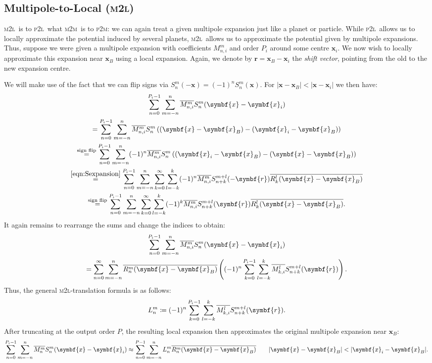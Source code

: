 \documentclass{scrbook}
\newcommand{\PtoM}{\textsc{p2m}}
\newcommand{\PtoL}{\textsc{p2l}}
\newcommand{\MtoM}{\textsc{m2m}}
\newcommand{\MtoL}{\textsc{m2l}}
\newcommand{\vv}[1]{\ensuremath{\symbf{#1}}} %
\begin{document}
\subsection{Multipole-to-Local (\MtoL)}
\MtoL\ is to \PtoL\ what \MtoM\ is to \PtoM: we can again treat a given
multipole expansion just like a planet or particle. While \PtoL\ allows
us to locally approximate the potential induced by several planets, \MtoL\
allows us to approximate the potential given by multipole expansions. Thus,
suppose we were given a multipole expansion with coefficients $M_{n,i}^m$ and
order $P_i$ around some centre $\vv{x}_i$. We now wish to locally approximate
this expansion near $\vv{x}_B$ using a local expansion. Again, we denote
by $\vv{r}=\vv{x}_B-\vv{x}_i$ the \emph{shift vector}, pointing from the old to
the new expansion centre.

We will make use of the fact that we can flip signs via $S_n^m(-\vv{x}) =
(-1)^nS_n^m(\vv{x})$. For $|\vv{x}-\vv{x}_B| < |\vv{x}-\vv{x}_i|$ we then have:
\begin{multline}
\sum_{n=0}^{P_i-1}\sum_{m=-n\vphantom{0}}^n%
\overline{M_{n,i}^m}S_n^m(\vv{x}-\vv{x}_i) \\
= 
\sum_{n=0}^{P_i-1}\sum_{m=-n\vphantom{0}}^n%
\overline{M_{n,i}^m}S_n^m\left((\vv{x}-\vv{x}_B)-(\vv{x}_i-\vv{x}_B)\right) \\
\stackrel{\text{sign flip}}{=}
\sum_{n=0}^{P_i-1}\sum_{m=-n\vphantom{0}}^n(-1)^n
\overline{M_{n,i}^m}S_n^m\left((\vv{x}_i-\vv{x}_B)-(\vv{x}-\vv{x}_B)\right) \\
\stackrel{\eqref{eqn:Sexpansion}}{=}
\sum_{n=0}^{P_i-1}\sum_{m=-n\vphantom{0}}^{n}
\sum_{k=0}^{\infty}\sum_{l=-k\vphantom{0}}^{k}(-1)^n
\overline{M_{n,i}^m}S_{n+k}^{m+l}(-\vv{r})\overline{R_k^l(\vv{x}-\vv{x}_B)} \\
\stackrel{\text{sign flip}}{=}
\sum_{n=0}^{P_i-1}\sum_{m=-n\vphantom{0}}^{n}
\sum_{k=0}^{\infty}\sum_{l=-k\vphantom{0}}^{k}(-1)^k
\overline{M_{n,i}^m}S_{n+k}^{m+l}(\vv{r})\overline{R_k^l(\vv{x}-\vv{x}_B)}.
\end{multline}
It again remains to rearrange the sums and change the indices to obtain:
\begin{multline}
\sum_{n=0}^{P_i-1}\sum_{m=-n\vphantom{0}}^n%
\overline{M_{n,i}^m}S_n^m(\vv{x}-\vv{x}_i) \\
=
\sum_{n=0}^\infty\sum_{m=-n\vphantom{0}}^n
\overline{R_n^m(\vv{x}-\vv{x}_B)}
\left(
(-1)^n
\sum_{k=0}^{P_i-1}\sum_{l=-k\vphantom{0}}^{k}
\overline{M_{k,i}^l}S_{n+k}^{m+l}(\vv{r})
\right).
\end{multline}
Thus, the general \MtoL-translation formula is as follows:
\begin{equation}
L_n^m\coloneqq (-1)^n
\sum_{k=0}^{P_i-1}\sum_{l=-k\vphantom{0}}^{k}
\overline{M_{k,i}^l}S_{n+k}^{m+l}(\vv{r}).
\end{equation}
After truncating at the output order $P$, the resulting local expansion then
approximates the original multipole expansion near $\vv{x}_B$:
\begin{equation}
\sum_{n=0}^{P_i-1}\sum_{\vphantom{0}m=-n}^n
\overline{M_n^m}S_n^m(\vv{x}-\vv{x}_i)
\approx
\sum_{n=0}^{P-1}\sum_{\vphantom{0}m=-n}^n
L_n^m\overline{R_n^m(\vv{x}-\vv{x}_B)}
\qquad |\vv{x}-\vv{x}_B| < |\vv{x}_i-\vv{x}_B|.
\end{equation}
\end{document}
